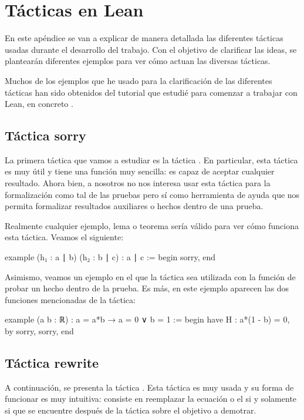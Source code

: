 \chapter{Tácticas en Lean}\label{apentacti}

En este apéndice se van a explicar de manera detallada las diferentes
tácticas usadas durante el desarrollo del trabajo. Con el objetivo de
clarificar las ideas, se plantearán diferentes ejemplos para ver cómo
actuan las diversas tácticas.

Muchos de los ejemplos que he usado para la clarificación de las
diferentes tácticas han sido obtenidos del tutorial que estudié para
comenzar a trabajar con Lean, en concreto \cite{tutor}.

\section{Táctica sorry}

La primera táctica que vamos a estudiar es la táctica
.  En particular, esta táctica es muy útil y
tiene una función muy sencilla: es capaz de aceptar cualquier
resultado. Ahora bien, a nosotros no nos interesa usar esta táctica para
la formalización como tal de las pruebas pero sí como herramienta de
ayuda que nos permita formalizar resultados auxiliares o hechos dentro
de una prueba.

Realmente cualquier ejemplo, lema o teorema sería válido para ver cómo
funciona esta táctica. Veamos el siguiente:
\begin{leancode}
example (h₁ : a ∣ b) (h₂ : b ∣ c) : a ∣ c :=
begin
  sorry,
end
\end{leancode}

Asimismo, veamos un ejemplo en el que la táctica 
sea utilizada con la función de probar un hecho dentro de la prueba. Es
más, en este ejemplo aparecen las dos funciones mencionadas de la
táctica:
\begin{leancode}
example (a b : ℝ) : a = a*b → a = 0 ∨ b = 1 :=
begin
  have H : a*(1 - b) = 0, by sorry,
  sorry,
end
\end{leancode}

\section{Táctica rewrite}

A continuación, se presenta la táctica . Esta
táctica es muy usada y su forma de funcionar es muy intuitiva: consiste
en reemplazar la ecuación o el si y solamente si que se encuentre
después de la táctica  sobre el objetivo a
demotrar.


